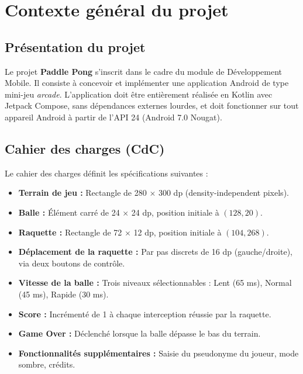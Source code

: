\documentclass[12pt,a4paper]{report}
\begin{document}
\section{Contexte g\'en\'eral du projet}
\subsection{Pr\'esentation du projet}
Le projet \textbf{Paddle Pong} s'inscrit dans le cadre du module de D\'eveloppement Mobile. Il consiste \`a concevoir et impl\'ementer une application Android de type mini-jeu \textit{arcade}. L'application doit \^etre enti\`erement r\'ealis\'ee en Kotlin avec Jetpack Compose, sans d\'ependances externes lourdes, et doit fonctionner sur tout appareil Android \`a partir de l'API 24 (Android 7.0 Nougat).

\subsection{Cahier des charges (CdC)}
Le cahier des charges d\'efinit les sp\'ecifications suivantes :
\begin{itemize}
    \item \textbf{Terrain de jeu :} Rectangle de 280 $\times$ 300 dp (density-independent pixels).
    \item \textbf{Balle :} \'El\'ement carr\'e de 24 $\times$ 24 dp, position initiale \`a $(128, 20)$.
    \item \textbf{Raquette :} Rectangle de 72 $\times$ 12 dp, position initiale \`a $(104, 268)$.
    \item \textbf{D\'eplacement de la raquette :} Par pas discrets de 16 dp (gauche/droite), via deux boutons de contr\^ole.
    \item \textbf{Vitesse de la balle :} Trois niveaux s\'electionnables : Lent (65 ms), Normal (45 ms), Rapide (30 ms).
    \item \textbf{Score :} Incr\'ement\'e de 1 \`a chaque interception r\'eussie par la raquette.
    \item \textbf{Game Over :} D\'eclench\'e lorsque la balle d\'epasse le bas du terrain.
    \item \textbf{Fonctionnalit\'es suppl\'ementaires :} Saisie du pseudonyme du joueur, mode sombre, cr\'edits.
\end{itemize}
\end{document}
